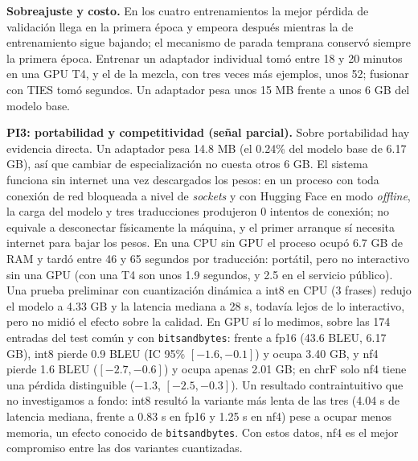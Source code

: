 \documentclass[11pt,a4paper]{article}
\begin{document}
\textbf{Sobreajuste y costo.} En los cuatro entrenamientos la mejor pérdida de validación llega en la primera época y empeora después mientras la de entrenamiento sigue bajando; el mecanismo de parada temprana conservó siempre la primera época. Entrenar un adaptador individual tomó entre 18 y 20 minutos en una GPU T4, y el de la mezcla, con tres veces más ejemplos, unos 52; fusionar con TIES tomó segundos. Un adaptador pesa unos 15 MB frente a unos 6 GB del modelo base.

\textbf{PI3: portabilidad y competitividad (señal parcial).} Sobre portabilidad hay evidencia directa. Un adaptador pesa 14.8 MB (el 0.24\% del modelo base de 6.17 GB), así que cambiar de especialización no cuesta otros 6 GB. El sistema funciona sin internet una vez descargados los pesos: en un proceso con toda conexión de red bloqueada a nivel de \textit{sockets} y con Hugging Face en modo \textit{offline}, la carga del modelo y tres traducciones produjeron 0 intentos de conexión; no equivale a desconectar físicamente la máquina, y el primer arranque sí necesita internet para bajar los pesos. En una CPU sin GPU el proceso ocupó 6.7 GB de RAM y tardó entre 46 y 65 segundos por traducción: portátil, pero no interactivo sin una GPU (con una T4 son unos 1.9 segundos, y 2.5 en el servicio público). Una prueba preliminar con cuantización dinámica a int8 en CPU (3 frases) redujo el modelo a 4.33 GB y la latencia mediana a 28 s, todavía lejos de lo interactivo, pero no midió el efecto sobre la calidad. En GPU sí lo medimos, sobre las 174 entradas del test común y con \texttt{bitsandbytes}: frente a fp16 (43.6 BLEU, 6.17 GB), int8 pierde 0.9 BLEU (IC 95\% $[-1.6, -0.1]$) y ocupa 3.40 GB, y nf4 pierde 1.6 BLEU ($[-2.7, -0.6]$) y ocupa apenas 2.01 GB; en chrF solo nf4 tiene una pérdida distinguible ($-1.3$, $[-2.5, -0.3]$). Un resultado contraintuitivo que no investigamos a fondo: int8 resultó la variante más lenta de las tres (4.04 s de latencia mediana, frente a 0.83 s en fp16 y 1.25 s en nf4) pese a ocupar menos memoria, un efecto conocido de \texttt{bitsandbytes}. Con estos datos, nf4 es el mejor compromiso entre las dos variantes cuantizadas.
\end{document}
